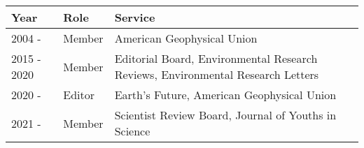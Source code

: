 
\begin{longtable}{llp{12cm}}
Year & Role & Service\\
\hline 
\endhead 
2004 -  & Member & American Geophysical Union \\
2015 - 2020 & Member & Editorial Board, Environmental Research Reviews, Environmental Research Letters \\
2020 -  & Editor & Earth’s Future, American Geophysical Union \\
2021 -  & Member & Scientist Review Board, Journal of Youths in Science \\
\end{longtable}

